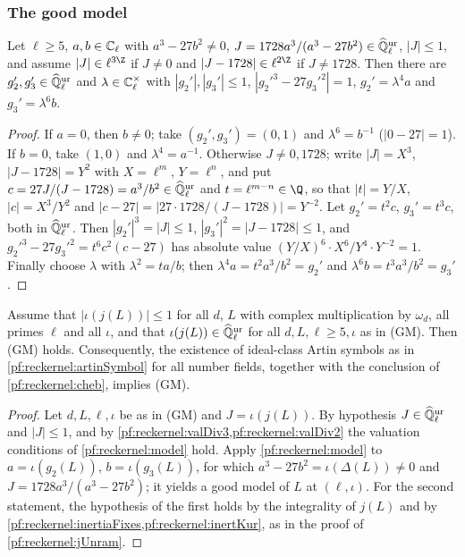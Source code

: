 \subsubsection{The good model}

\begin{lemma}\label{pf:reckernel:model}
Let $\ell\ge5$, $a,b\in\mathbb{C}_\ell$ with $a^3-27b^2\ne0$, $J=1728a^3/(a^3-27b^2)\in\widehat{\mathbb{Q}}{}_\ell^{\mathrm{ur}}$, $|J|\le1$, and assume
$|J|\in\ell^{3\Z}$ if $J\ne0$ and $|J-1728|\in\ell^{2\Z}$ if $J\ne1728$. Then there are $g_2',g_3'\in\widehat{\mathbb{Q}}{}_\ell^{\mathrm{ur}}$ and
$\lambda\in\mathbb{C}_\ell^\times$ with $|g_2'|,|g_3'|\le1$, $|g_2'^3-27g_3'^2|=1$, $g_2'=\lambda^4a$ and $g_3'=\lambda^6b$.
\end{lemma}

\begin{proof}
If $a=0$, then $b\ne0$; take $(g_2',g_3')=(0,1)$ and $\lambda^6=b^{-1}$ ($|0-27|=1$). If $b=0$, take $(1,0)$ and
$\lambda^4=a^{-1}$. Otherwise $J\ne0,1728$; write $|J|=X^3$, $|J-1728|=Y^2$ with $X=\ell^{m}$, $Y=\ell^{n}$, and
put $c=27J/(J-1728)=a^3/b^2\in\widehat{\mathbb{Q}}{}_\ell^{\mathrm{ur}}$ and $t=\ell^{m-n}\in\Q$, so that $|t|=Y/X$, $|c|=X^3/Y^2$ and
$|c-27|=|27\cdot1728/(J-1728)|=Y^{-2}$. Let $g_2'=t^2c$, $g_3'=t^3c$, both in $\widehat{\mathbb{Q}}{}_\ell^{\mathrm{ur}}$. Then $|g_2'|^3=|J|\le1$,
$|g_3'|^2=|J-1728|\le1$, and $g_2'^3-27g_3'^2=t^6c^2(c-27)$ has absolute value
$(Y/X)^6\cdot X^6/Y^4\cdot Y^{-2}=1$. Finally choose $\lambda$ with $\lambda^2=ta/b$; then
$\lambda^4a=t^2a^3/b^2=g_2'$ and $\lambda^6b=t^3a^3/b^2=g_3'$.
\end{proof}

\begin{theorem}\label{pf:reckernel:goodRed}
Assume that $|\iota(j(L))|\le1$ for all $d$, $L$ with complex multiplication by $\omega_d$, all primes $\ell$ and all
$\iota$, and that $\iota(j(L))\in\widehat{\mathbb{Q}}{}_\ell^{\mathrm{ur}}$ for all $d,L,\ell\ge5,\iota$ as in \textup{(GM)}. Then \textup{(GM)} holds. Consequently, the existence of ideal-class Artin symbols as in
\cref{pf:reckernel:artinSymbol} for all number fields, together with the conclusion of \cref{pf:reckernel:cheb},
implies \textup{(GM)}.
\end{theorem}

\begin{proof}
Let $d,L,\ell,\iota$ be as in \textup{(GM)} and $J=\iota(j(L))$. By hypothesis $J\in\widehat{\mathbb{Q}}{}_\ell^{\mathrm{ur}}$ and $|J|\le1$, and by
\cref{pf:reckernel:valDiv3,pf:reckernel:valDiv2} the valuation conditions of \cref{pf:reckernel:model} hold. Apply
\cref{pf:reckernel:model} to $a=\iota(g_2(L))$, $b=\iota(g_3(L))$, for which $a^3-27b^2=\iota(\Delta(L))\ne0$ and
$J=1728a^3/(a^3-27b^2)$; it yields a good model of $L$ at $(\ell,\iota)$. For the second statement, the
hypothesis of the first holds by the integrality of $j(L)$ and by
\cref{pf:reckernel:inertiaFixes,pf:reckernel:inertKur}, as in the proof of \cref{pf:reckernel:jUnram}.
\end{proof}

